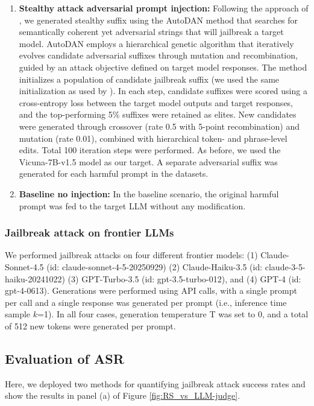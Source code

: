 \documentclass{article}
\theoremstyle{remark} %
\begin{document}
\begin{enumerate}
  \item \textbf{Stealthy attack adversarial prompt injection:} Following the approach of \cite{liu2024autodan}, we generated stealthy suffix using the AutoDAN method that searches for semantically coherent yet adversarial strings that will jailbreak a target model. AutoDAN employs a hierarchical genetic algorithm that iteratively evolves candidate adversarial suffixes through mutation and recombination, guided by an attack objective defined on target model responses. The method initializes a population of candidate jailbreak suffix (we used the same initialization as used by \cite{liu2024autodan}). In each step, candidate suffixes were scored using a cross-entropy loss between the target model outputs and target responses, and the top-performing 5\% suffixes were retained as elites. New candidates were generated through crossover (rate 0.5 with 5-point recombination) and mutation (rate 0.01), combined with hierarchical token- and phrase-level edits. Total 100 iteration steps were performed. As before, we used the Vicuna-7B-v1.5 model as our target. A separate adversarial suffix was generated for each harmful prompt in the datasets. 
  \item \textbf{Baseline no injection:} In the baseline scenario, the original harmful prompt was fed to the target LLM without any modification. 
\end{enumerate}

\subsubsection{Jailbreak attack on frontier LLMs}
We performed jailbreak attacks on four different frontier models: (1) Claude-Sonnet-4.5 (id: claude-sonnet-4-5-20250929) (2) Claude-Haiku-3.5 (id: claude-3-5-haiku-20241022) (3) GPT-Turbo-3.5 (id: gpt-3.5-turbo-012), and (4) GPT-4 (id: gpt-4-0613). Generations were performed using API calls, with a single prompt per call and a single response was generated per prompt (i.e., inference time sample $k$=1). In all four cases, generation temperature T was set to 0, and a total of 512 new tokens were generated per prompt. 

\subsection{Evaluation of ASR}
Here, we deployed two methods for quantifying 
jailbreak attack success rates and show the results in panel (a) of Figure \ref{fig:RS_vs_LLM-judge}. 
\end{document}

